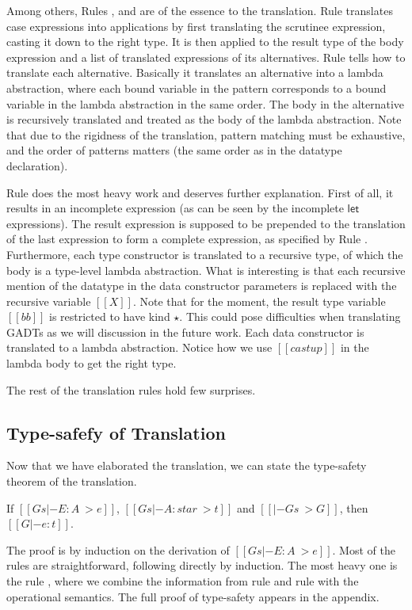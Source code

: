 Among others, Rules ,  and
 are of the essence to the translation. Rule
 translates case expressions into applications by
first translating the scrutinee expression, casting it down to the
right type. It is then applied to the result type of the body
expression and a list of translated \name expressions of its
alternatives. Rule  tells how to translate each
alternative. Basically it translates an alternative into a lambda
abstraction, where each bound variable in the pattern corresponds to a
bound variable in the lambda abstraction in the same order. The body
in the alternative is recursively translated and treated as the body
of the lambda abstraction. Note that due to the rigidness of the
translation, pattern matching must be exhaustive, and the order of
patterns matters (the same order as in the datatype declaration).

Rule  does the most heavy work and deserves
further explanation. First of all, it results in an incomplete
expression (as can be seen by the incomplete $\mathsf{let}$
expressions). The result expression is supposed to be prepended to the
translation of the last expression to form a complete \name
expression, as specified by Rule . Furthermore,
each type constructor is translated to a recursive type, of which the
body is a type-level lambda abstraction. What is interesting is that
each recursive mention of the datatype in the data constructor
parameters is replaced with the recursive variable $[[X]]$. Note that
for the moment, the result type variable $[[bb]]$ is restricted to
have kind $\star$. This could pose difficulties when translating GADTs
as we will discussion in the future work. Each data constructor is
translated to a lambda abstraction. Notice how we use $[[castup]]$ in
the lambda body to get the right type.

The rest of the translation rules hold few surprises.

\subsection{Type-safefy of Translation}

Now that we have elaborated the translation, we can state the
type-safety theorem of the translation.

\begin{thm}
If $[[Gs |- E:A ~> e]]$, $[[Gs |- A:star ~> t]]$ and $[[|- Gs ~> G]]$, then
$[[G |- e:t]]$.
\end{thm}

The proof is by induction on the derivation of $[[Gs |- E : A ~> e]]$.
Most of the rules are straightforward, following directly by
induction. The most heavy one is the rule , where we
combine the information from rule  and rule
 with the operational semantics. The full proof of
type-safety appears in the appendix.

